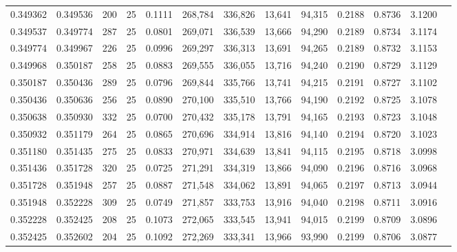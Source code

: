\begin{tabular}{rrrrrrrrrrrrr}
0.349362 & 0.349536 &   200 &  25 &                                     0.1111 & 268,784 & 336,826 &  13,641 &  94,315 & 0.2188 & 0.8736 & 3.1200 \\
0.349537 & 0.349774 &   287 &  25 &                                     0.0801 & 269,071 & 336,539 &  13,666 &  94,290 & 0.2189 & 0.8734 & 3.1174 \\
0.349774 & 0.349967 &   226 &  25 &                                     0.0996 & 269,297 & 336,313 &  13,691 &  94,265 & 0.2189 & 0.8732 & 3.1153 \\
0.349968 & 0.350187 &   258 &  25 &                                     0.0883 & 269,555 & 336,055 &  13,716 &  94,240 & 0.2190 & 0.8729 & 3.1129 \\
0.350187 & 0.350436 &   289 &  25 &                                     0.0796 & 269,844 & 335,766 &  13,741 &  94,215 & 0.2191 & 0.8727 & 3.1102 \\
0.350436 & 0.350636 &   256 &  25 &                                     0.0890 & 270,100 & 335,510 &  13,766 &  94,190 & 0.2192 & 0.8725 & 3.1078 \\
0.350638 & 0.350930 &   332 &  25 &                                     0.0700 & 270,432 & 335,178 &  13,791 &  94,165 & 0.2193 & 0.8723 & 3.1048 \\
0.350932 & 0.351179 &   264 &  25 &                                     0.0865 & 270,696 & 334,914 &  13,816 &  94,140 & 0.2194 & 0.8720 & 3.1023 \\
0.351180 & 0.351435 &   275 &  25 &                                     0.0833 & 270,971 & 334,639 &  13,841 &  94,115 & 0.2195 & 0.8718 & 3.0998 \\
0.351436 & 0.351728 &   320 &  25 &                                     0.0725 & 271,291 & 334,319 &  13,866 &  94,090 & 0.2196 & 0.8716 & 3.0968 \\
0.351728 & 0.351948 &   257 &  25 &                                     0.0887 & 271,548 & 334,062 &  13,891 &  94,065 & 0.2197 & 0.8713 & 3.0944 \\
0.351948 & 0.352228 &   309 &  25 &                                     0.0749 & 271,857 & 333,753 &  13,916 &  94,040 & 0.2198 & 0.8711 & 3.0916 \\
0.352228 & 0.352425 &   208 &  25 &                                     0.1073 & 272,065 & 333,545 &  13,941 &  94,015 & 0.2199 & 0.8709 & 3.0896 \\
0.352425 & 0.352602 &   204 &  25 &                                     0.1092 & 272,269 & 333,341 &  13,966 &  93,990 & 0.2199 & 0.8706 & 3.0877 \\

\end{tabular}

